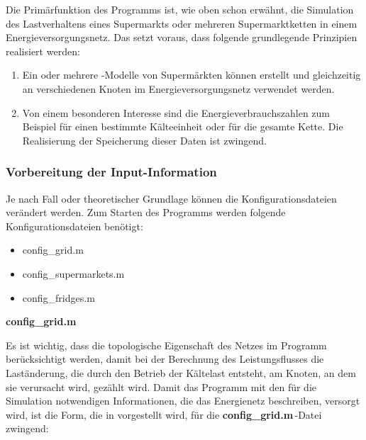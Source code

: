 Die Primärfunktion des Programms ist, wie oben schon erwähnt, die Simulation des
Lastverhaltens eines Supermarkts oder mehreren Supermarktketten in einem
Energieversorgungsnetz. Das setzt voraus, dass folgende grundlegende Prinzipien
realisiert werden:
\begin{enumerate}
	\item Ein oder mehrere \matlab-Modelle von Supermärkten können erstellt
	und gleichzeitig an verschiedenen Knoten im Energieversorgungsnetz
	verwendet werden.
	\item Von einem besonderen Interesse sind die Energieverbrauchszahlen
	zum Beispiel für einen bestimmte Kälteeinheit oder für die gesamte
	Kette. Die Realisierung der Speicherung dieser Daten ist zwingend.
\end{enumerate}

\subsubsection*{Vorbereitung der Input-Information}
\label{sec:input_infos}

Je nach Fall oder theoretischer Grundlage können die Konfigurationsdateien
verändert werden.  Zum Starten des Programms werden
folgende Konfigurationsdateien benötigt:

\begin{itemize}
	\item config\_grid.m
	\item config\_supermarkets.m
	\item config\_fridges.m
\end{itemize}
\vspace{3mm}
\noindent\textbf{config\_grid.m}
\vspace{3mm}

Es ist wichtig, dass die topologische Eigenschaft des Netzes im Programm
berücksichtigt werden, damit bei der Berechnung des Leistungsflusses die
Laständerung, die durch den Betrieb der Kältelast entsteht, am Knoten, an dem
sie verursacht wird, gezählt wird. Damit das Programm mit
den für die Simulation notwendigen Informationen, die das Energienetz
beschreiben, versorgt wird, ist die Form, die in  vorgestellt
wird, für die \textbf{config\_grid.m$\,$}-Datei zwingend:

